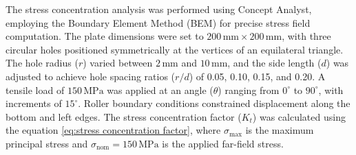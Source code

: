 \documentclass[a4paper,11pt]{article}
\begin{document}
\vspace{-10pt} %
The stress concentration analysis was performed using Concept Analyst\cite{conceptanalyst2024}, employing the Boundary Element Method (BEM) for precise stress field computation. The plate dimensions were set to \(200 \, \mathrm{mm} \times 200 \, \mathrm{mm}\), with three circular holes positioned symmetrically at the vertices of an equilateral triangle. The hole radius (\(r\)) varied between \(2 \, \mathrm{mm}\) and \(10 \, \mathrm{mm}\), and the side length (\(d\)) was adjusted to achieve hole spacing ratios (\(r/d\)) of 0.05, 0.10, 0.15, and 0.20. A tensile load of \(150 \, \mathrm{MPa}\) was applied at an angle (\(\theta\)) ranging from \(0^\circ\) to \(90^\circ\), with increments of \(15^\circ\). Roller boundary conditions constrained displacement along the bottom and left edges. The stress concentration factor (\(K_t\)) was calculated using the equation \ref{eq:stress concentration factor}, where \(\sigma_{\text{max}}\) is the maximum principal stress and \(\sigma_{\text{nom}} = 150 \, \mathrm{MPa}\) is the applied far-field stress.  

 
\end{document}
